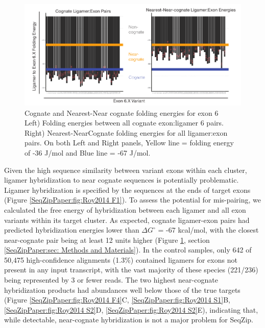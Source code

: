 		\begin{figure} %
			\centering 
			\includegraphics{Figures/SeqZipPaper/Roy2014FigS3.eps}
			\caption[Cognate and Nearest-Near cognate folding energies for \dscam{} exon 6]
			{
				Cognate and Nearest-Near cognate folding energies for \dscam{} exon 6\\[0.25cm]
				Left) Folding energies between all cognate exon:ligamer 6 pairs. Right) Nearest-NearCognate folding energies for all ligamer:exon pairs. On both Left and Right panels, Yellow line = folding energy of -36 J/mol and Blue line = -67 J/mol.
				}
			\label{SeqZipPaper:fig:Roy2014 FS3}
			\end{figure}

		Given the high sequence similarity between variant exons within each cluster, ligamer hybridization to near cognate sequences is potentially problematic. Ligamer hybridization is specified by the sequences at the ends of target exons (Figure \ref{SeqZipPaper:fig:Roy2014 F1}). To assess the potential for mis-pairing, we calculated the free energy of hybridization \citep{Reuter2010} between each ligamer and all exon variants within its target cluster. As expected, cognate ligamer-exon pairs had predicted hybridization energies lower than $\Delta G^{\circ}$ = -67 kcal/mol, with the closest near-cognate pair being at least 12 units higher (Figure \ref{SeqZipPaper:fig:Roy2014 FS3}, section \ref{SeqZipPaper:sec: Methods and Materials}). In the control samples, only 642 of 50,475 high-confidence alignments (1.3\%) contained ligamers for exons not present in any input transcript, with the vast majority of these species (221/236) being represented by 3 or fewer reads.  The two highest near-cognate hybridization products had abundances well below those of the true targets (Figure \ref{SeqZipPaper:fig:Roy2014 F4}C, \ref{SeqZipPaper:fig:Roy2014 S1}B, \ref{SeqZipPaper:fig:Roy2014 S2}D, \ref{SeqZipPaper:fig:Roy2014 S2}E), indicating that, while detectable, near-cognate hybridization is not a major problem for SeqZip.

